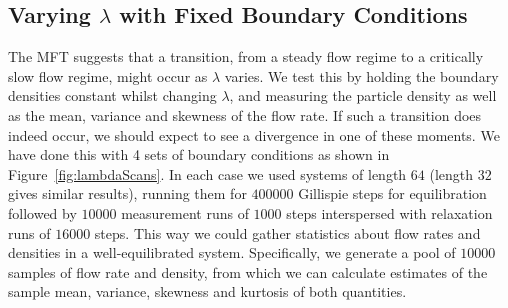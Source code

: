 \subsection{Varying $\lambda$ with Fixed Boundary Conditions}
The MFT suggests that a  transition, from a steady flow regime to a critically slow flow regime, might occur as $\lambda$ varies.
We test this by holding the boundary densities constant
whilst changing $\lambda$, and measuring the particle density as well as the mean, variance and skewness of the flow rate. If such a transition does indeed occur, we should expect to see a divergence in one of these moments.
We have done this with 4 sets of boundary conditions as shown in Figure~\ref{fig:lambdaScans}. In each case we used systems of length $64$ (length $32$ gives similar results),
running them for $400000$ Gillispie steps for equilibration followed by $10000$ measurement runs of $1000$ steps interspersed with relaxation runs of $16000$
steps. This way we could gather statistics about flow rates and densities in a well-equilibrated system. Specifically, we generate a pool of $10000$ samples of flow rate and density,
from which we can calculate estimates of the sample mean, variance, skewness and kurtosis of both quantities.
